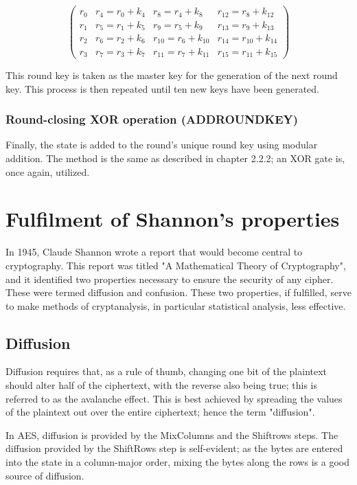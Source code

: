 \documentclass[12pt]{report}
\begin{document}
\[ \left( \begin{array}{cccc}
r_0 & r_4=r_0+k_4 & r_8=r_4+k_8 & r_{12}=r_8+k_{12} \\
r_1 & r_5=r_1+k_5 & r_9=r_5+k_9 & r_{13}=r_9+k_{13} \\
r_2 & r_6=r_2+k_6 & r_{10}=r_6+k_{10} & r_{14}=r_{10}+k_{14} \\
r_3 & r_7=r_3+k_7 & r_{11}=r_7+k_{11} & r_{15}=r_{11}+k_{15}\end{array} \right) \]

This round key is taken as the master key for the generation of the next round key. This process is then repeated until ten new keys have been generated.

\subsubsection{Round-closing XOR operation (ADDROUNDKEY)}
Finally, the state is added to the round's unique round key using modular addition. The method is the same as described in chapter 2.2.2; an XOR gate is, once again, utilized.

\section{Fulfilment of Shannon's properties}
In 1945, Claude Shannon wrote a report that would become central to cryptography. This report was titled "A Mathematical Theory of Cryptography", and it identified two properties necessary to ensure the security of any cipher\cite{ShannonProperties}. These were termed diffusion and confusion. These two properties, if fulfilled, serve to make methods of cryptanalysis, in particular statistical analysis, less effective.

\subsection{Diffusion}
Diffusion requires that, as a rule of thumb, changing one bit of the plaintext should alter half of the ciphertext, with the reverse also being true; this is referred to as the avalanche effect\cite{AvalancheEffect}. This is best achieved by spreading the values of the plaintext out over the entire ciphertext; hence the term "diffusion".

In AES, diffusion is  provided by the MixColumns and the Shiftrows steps. The diffusion provided by the ShiftRows step is self-evident; as the bytes are entered into the state in a column-major order, mixing the bytes along the rows is a good source of diffusion.
\end{document}
